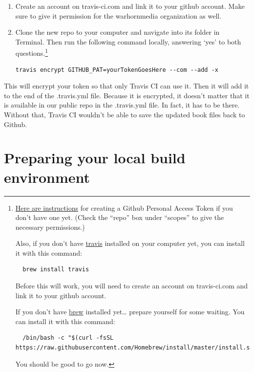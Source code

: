\documentclass[
]{book}
\begin{document}
\begin{enumerate}
\def\labelenumi{\arabic{enumi}.}
\setcounter{enumi}{2}
\item
  Create an account on travis-ci.com and link it to your github account. Make sure to give it permission for the warhornmedia organization as well.
\item
  Clone the new repo to your computer and navigate into its folder in Terminal. Then run the following command locally, answering `yes' to both questions.\footnote{\href{https://docs.github.com/en/free-pro-team@latest/github/authenticating-to-github/creating-a-personal-access-token}{Here are instructions} for creating a Github Personal Access Token if you don't have one yet. (Check the ``repo'' box under ``scopes'' to give the necessary permissions.)

    Also, if you don't have \href{https://github.com/travis-ci/travis.rb\#installation}{travis} installed on your computer yet, you can install it with this command:

\begin{Verbatim}
  brew install travis
\end{Verbatim}

    Before this will work, you will need to create an account on travis-ci.com and link it to your github account.

    If you don't have \href{https://brew.sh}{brew} installed yet\ldots{} prepare yourself for some waiting. You can install it with this command:

\begin{Verbatim}
  /bin/bash -c "$(curl -fsSL https://raw.githubusercontent.com/Homebrew/install/master/install.sh)"
\end{Verbatim}

    You should be good to go now.}

\begin{verbatim}
travis encrypt GITHUB_PAT=yourTokenGoesHere --com --add -x
\end{verbatim}
\end{enumerate}

This will encrypt your token so that only Travis CI can use it. Then it will add it to the end of the .travis.yml file. Because it is encrypted, it doesn't matter that it is available in our public repo in the .travis.yml file. In fact, it has to be there. Without that, Travis CI wouldn't be able to save the updated book files back to Github.

\hypertarget{preparing-your-local-build-environment}{%
\section{Preparing your local build environment}\label{preparing-your-local-build-environment}}
\end{document}
